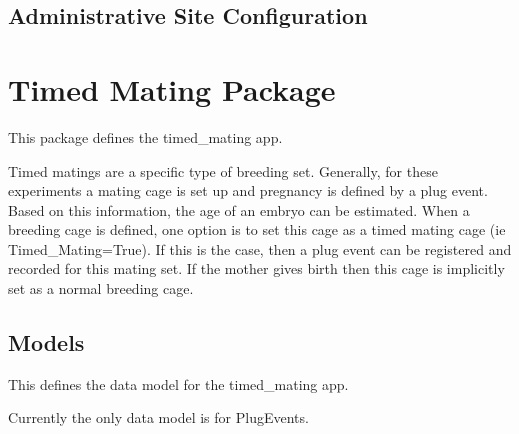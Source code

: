 \documentclass[letterpaper,10pt,english]{sphinxmanual}
\begin{document}
\subsection{Administrative Site Configuration}
\label{api:id4}

\section{Timed Mating Package}
\label{api:module-timed_mating}\label{api:timed-mating-package}
This package defines the timed\_mating app.

Timed matings are a specific type of breeding set.  
Generally, for these experiments a mating cage is set up and pregnancy is defined by a plug event.  
Based on this information, the age of an embryo can be estimated.  
When a breeding cage is defined, one option is to set this cage as a timed mating cage (ie Timed\_Mating=True).  
If this is the case, then a plug event can be registered and recorded for this mating set.  
If the mother gives birth then this cage is implicitly set as a normal breeding cage.


\subsection{Models}
\label{api:id5}\label{api:module-timed_mating.models}
This defines the data model for the timed\_mating app.

Currently the only data model is for PlugEvents.
\end{document}
